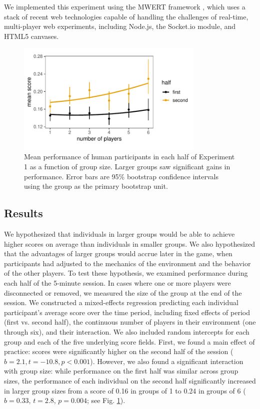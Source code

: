 \documentclass[12pt,letterpaper]{article}
\begin{document}
We implemented this experiment using the MWERT framework \cite{hawkins_conducting_2014}, which uses a stack of recent web technologies capable of handling the challenges of real-time, multi-player web experiments, including Node.js, the Socket.io module, and HTML5 canvases.  

\begin{figure}[t!]
  \centering
  \includegraphics[width=0.8\textwidth]{./figures/performance-summary-exp1.pdf}
  \caption{Mean performance of human participants in each half of Experiment 1 as a function of group size. Larger groups saw significant gains in performance. Error bars are 95\% bootstrap confidence intervals using the group as the primary bootstrap unit. }
  \label{fig:exp1_performance}
\end{figure}

\subsection{Results}

We hypothesized that individuals in larger groups would be able to achieve higher scores on average than individuals in smaller groups. 
We also hypothesized that the advantages of larger groups would accrue later in the game, when participants had adjusted to the mechanics of the environment and the behavior of the other players.
To test these hypothesis, we examined performance during each half of the 5-minute session. 
In cases where one or more players were disconnected or removed, we measured the size of the group at the end of the session.
We constructed a mixed-effects regression predicting each individual participant's average score over the time period, including fixed effects of period (first vs. second half), the continuous number of players in their environment (one through six), and their interaction.
We also included random intercepts for each group and each of the five underlying score fields.
First, we found a main effect of practice: scores were significantly higher on the second half of the session ($b = 2.1,t=-10.8, p < 0.001$).
However, we also found a significant interaction with group size: while performance on the first half was similar across group sizes, the performance of each individual on the second half significantly increased in larger group sizes from a score of 0.16 in groups of 1 to 0.24 in groups of 6 ($b = 0.33$, $t = 2.8$, $p = 0.004$; see Fig. \ref{fig:exp1_performance}). 
\end{document}
